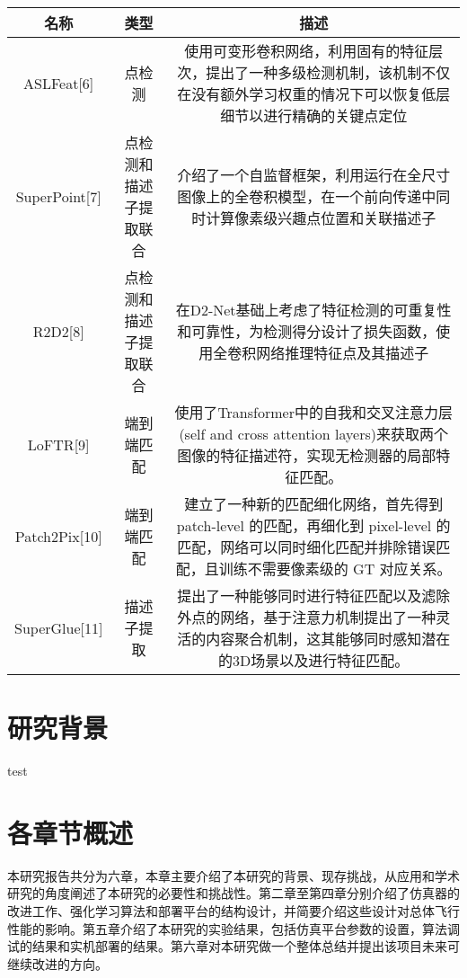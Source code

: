 \begin{table}[!ht]
  \centering
  \begin{tabular}{|c|c|c|}
  \hline
      名称 & 类型 & 描述 \\ \hline
      ASLFeat[6] & 点检测 & \parbox[c]{6cm}{使用可变形卷积网络，利用固有的特征层次，提出了一种多级检测机制，该机制不仅在没有额外学习权重的情况下可以恢复低层细节以进行精确的关键点定位} \\ \hline
      SuperPoint[7] & 点检测和描述子提取联合 & \parbox[c][15ex]{6cm}{介绍了一个自监督框架，利用运行在全尺寸图像上的全卷积模型，在一个前向传递中同时计算像素级兴趣点位置和关联描述子} \\ \hline
      R2D2[8] & 点检测和描述子提取联合 & \parbox[c]{6cm}{在D2-Net基础上考虑了特征检测的可重复性和可靠性，为检测得分设计了损失函数，使用全卷积网络推理特征点及其描述子} \\ \hline
      LoFTR[9] & 端到端匹配 &\parbox[c]{6cm}{ 使用了Transformer中的自我和交叉注意力层(self and cross attention layers)来获取两个图像的特征描述符，实现无检测器的局部特征匹配。} \\ \hline
      Patch2Pix[10] & 端到端匹配 & \parbox[c]{6cm}{建立了一种新的匹配细化网络，首先得到 patch-level 的匹配，再细化到 pixel-level 的匹配，网络可以同时细化匹配并排除错误匹配，且训练不需要像素级的 GT 对应关系。} \\ \hline
      SuperGlue[11] & 描述子提取 & \parbox[c]{6cm}{提出了一种能够同时进行特征匹配以及滤除外点的网络，基于注意力机制提出了一种灵活的内容聚合机制，这其能够同时感知潜在的3D场景以及进行特征匹配。} \\ \hline
  \end{tabular}
\end{table}

\section{研究背景}
test

\section{各章节概述}
\label{outline}
本研究报告共分为六章，本章主要介绍了本研究的背景、现存挑战，从应用和学术研究的角度阐述了本研究的必要性和挑战性。第二章至第四章分别介绍了仿真器的改进工作、强化学习算法和部署平台的结构设计，并简要介绍这些设计对总体飞行性能的影响。第五章介绍了本研究的实验结果，包括仿真平台参数的设置，算法调试的结果和实机部署的结果。第六章对本研究做一个整体总结并提出该项目未来可继续改进的方向。



